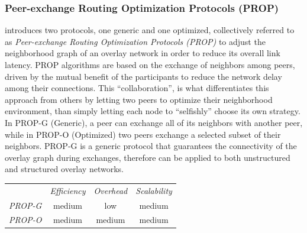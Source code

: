 \subsubsection{Peer-exchange Routing Optimization Protocols (PROP)}
\cite{QCYCZ2007} introduces two protocols, one generic and one optimized,
collectively referred to as \emph{Peer-exchange Routing Optimization Protocols
(PROP)} to adjust the neighborhood graph of an overlay network in order to
reduce its overall link latency. PROP algorithms are based on the exchange of
neighbors among peers, driven by the mutual benefit of the participants to
reduce the network delay among their connections. This ``collaboration'', is
what differentiates this approach from others by letting two peers to optimize
their neighborhood environment, than simply letting each node to ``selfishly''
choose its own strategy. In PROP-G (Generic), a peer can exchange all of its
neighbors with another peer, while in PROP-O (Optimized) two peers exchange a
selected subset of their neighbors. PROP-G is a generic protocol that guarantees
the connectivity of the overlay graph during exchanges, therefore can be applied
to both unstructured and structured overlay networks.

\begin{center}
\begin{tabular}{rccc}
\multicolumn{1}{r}{} &
\multicolumn{1}{c}{\emph{Efficiency}} &
\multicolumn{1}{c}{\emph{Overhead}} &
\multicolumn{1}{c}{\emph{Scalability}}
\\
\cline{2-4}
\emph{PROP-G} &
medium &
low &
medium \\
\emph{PROP-O} &
medium &
medium &
medium \\
\end{tabular}
\end{center}


